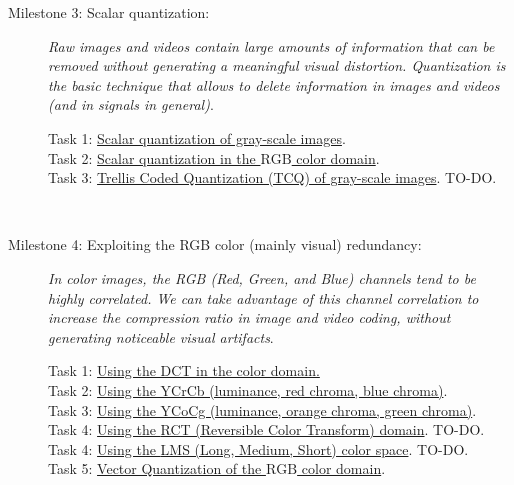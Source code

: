 \begin{description}
\item [Milestone 3: {\normalfont Scalar quantization:}] \emph{Raw images
and videos contain large amounts of information that can be removed
without generating a meaningful visual distortion. Quantization is the
basic technique that allows to delete information in images and videos
(and in signals in general)}.
  \begin{description}
  \item [Task 1: {\normalfont
      \href{https://sistemas-multimedia.github.io/contents/gray_SQ/}{Scalar
        quantization of gray-scale images}.}]
  \item [Task 2: {\normalfont
      \href{https://sistemas-multimedia.github.io/contents/RGB_SQ/}{Scalar
        quantization in the $\text{RGB}$ color domain}.}]
  \item [Task 3: {\normalfont
      \href{https://sistemas-multimedia.github.io/contents/gray_TCQ/}{Trellis
        Coded Quantization (TCQ) of gray-scale images}. TO-DO.}]
  \end{description}
  ~\newline
  
 \item [Milestone 4: {\normalfont Exploiting the RGB color (mainly
     visual) redundancy:}] \emph{In color images, the RGB (Red, Green,
 and Blue) channels tend to be highly correlated. We can take
 advantage of this channel correlation to increase the compression
 ratio in image and video coding, without generating noticeable visual
 artifacts}.
   \begin{description}
   \item [Task 1: {\normalfont
       \href{https://sistemas-multimedia.github.io/contents/RGB_DCT/}{Using
         the DCT in the color domain.}}]
   \item [Task 2: {\normalfont
       \href{https://sistemas-multimedia.github.io/contents/YCrCb/}{Using the
         YCrCb (luminance, red chroma, blue chroma)}.}]
   \item [Task 3: {\normalfont
       \href{https://sistemas-multimedia.github.io/contents/YCoCg/}{Using the 
         YCoCg (luminance, orange chroma, green chroma)}.}]
   \item [Task 4: {\normalfont
       \href{https://sistemas-multimedia.github.io/contents/RCT/}{Using the
         \href{https://en.wikipedia.org/wiki/JPEG_2000\#Color_components_transformation}{RCT
           (Reversible Color Transform) domain}}. TO-DO.}]
   \item [Task 4: {\normalfont
       \href{https://sistemas-multimedia.github.io/contents/LMS/}{Using the
         \href{https://en.wikipedia.org/wiki/LMS}{LMS
           (Long, Medium, Short}) color space}. TO-DO.}]
   \item [Task 5: {\normalfont
       \href{https://sistemas-multimedia.github.io/contents/RGB_VQ/}{Vector
         Quantization of the $\text{RGB}$ color domain}.}]
   \end{description}
   ~\newline
   

\end{description}
